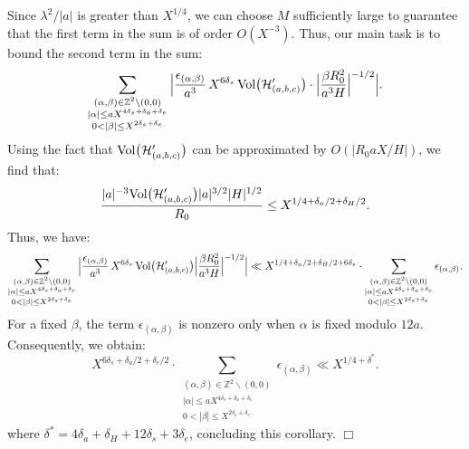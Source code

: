 \documentclass{article}
\def\Vol{{\rm Vol}}
\def\H{{\mathcal H}}
\def\H{{\mathcal H}}
\newenvironment{proof}{\noindent {\bf Proof:}}{$\Box$ \vspace{2 ex}}
\begin{document}
\begin{proof}
Since $\lambda^2 / |a|$ is greater than $X^{1/4}$, we can choose $M$ sufficiently large to guarantee that the first term in the sum is of order $O(X^{-3})$. Thus, our main task is to bound the second term in the sum:
\begin{equation*} \sum_{\substack{(\alpha, \beta) \in \mathbb{Z}^2 \backslash {(0, 0)} \\ |\alpha| \leq aX^{4\delta_s + \delta_a + \delta_e} \\ 0 < |\beta| \leq X^{2\delta_s + \delta_e}}} \Big| \frac{\epsilon_{(\alpha, \beta)}}{a^3} \, X^{6\delta_s} \, \Vol\big(\H'_{(a,b,c)}\big) \cdot \Big|\frac{\beta R_0^2}{a^3 H}\Big|^{-1/2} \Big|. \end{equation*}
Using the fact that $\Vol\big(\H'_{(a,b,c)}\big)$ can be approximated by $O(|R_0a X / H|)$, we find that: 
\begin{equation*}  \frac{|a|^{-3} \Vol\big(\H'_{(a,b,c)}\big)|a|^{3/2} |H|^{1/2}}{R_0}  \leq X^{1/4 + \delta_a / 2 + \delta_H / 2}. \end{equation*}
Thus, we have:
\begin{equation*} \sum_{\substack{(\alpha, \beta) \in \mathbb{Z}^2 \backslash {(0, 0)} \\ |\alpha| \leq aX^{4\delta_s + \delta_a + \delta_e} \\ 0 < |\beta| \leq X^{2\delta_s + \delta_e}}} \Big| \frac{\epsilon_{(\alpha, \beta)}}{a^3} \, X^{6\delta_s} \, \Vol\big(\H'_{(a,b,c)}\big)\Big|\frac{\beta R_0^2}{a^3 H}\Big|^{-1/2} \Big| \ll 
X^{1/4 + \delta_a / 2 + \delta_H / 2 + 6\delta_s} \cdot \sum_{\substack{(\alpha, \beta) \in \mathbb{Z}^2 \backslash {(0, 0)} \\ |\alpha| \leq aX^{4\delta_s + \delta_a + \delta_e} \\ 0 < |\beta| \leq X^{2\delta_s + \delta_e}}} \epsilon_{(\alpha, \beta)}. \end{equation*}
For a fixed $\beta$, the term $\epsilon_{(\alpha, \beta)}$ is nonzero only when $\alpha$ is fixed modulo $12a$. Consequently, we obtain:
\begin{equation*} 
X^{6\delta_s + \delta_a / 2 + \delta_e / 2} \cdot \sum_{\substack{(\alpha, \beta) \in \mathbb{Z}^2 \backslash {(0, 0)} \\ |\alpha| \leq aX^{4\delta_s + \delta_a + \delta_e} \\ 0 < |\beta| \leq X^{2\delta_s + \delta_e}}} \epsilon_{(\alpha, \beta)} \ll X^{1/4 + \delta^*}. 
\end{equation*}
 where $\delta^* = 4\delta_a + \delta_H + 12\delta_s + 3\delta_e$, concluding this corollary. 
\end{proof}
\end{document}
